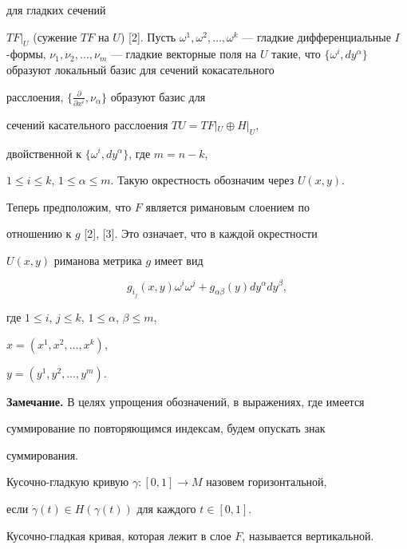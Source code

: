 для гладких сечений 


$TF|_U$ (сужение $TF$ на $U$) [2]. Пусть $\omega^1, \omega^2, \dotsc, 


\omega^k$ --- гладкие дифференциальные $I$-формы, $\nu_1, \nu_2, \dotsc, 


\nu_m$ --- гладкие векторные поля на $U$ такие, что $\{\omega^i, 


dy^\alpha\}$ образуют локальный базис для сечений кокасательного 


расслоения, $\{\frac {\partial}{\partial x^i},\nu_\alpha\}$ образуют базис для 


сечений касательного расслоения $TU=TF|_U\oplus H|_U$, 


двойственной к $\{\omega^i, dy^\alpha\}$, где $m=n-k$,


$1\leq i\leq k$, $1\leq 


\alpha \leq m$. Такую окрестность обозначим через $U(x,y)$.





Теперь предположим, что $F$ является римановым слоением по 


отношению к $g$ [2], [3]. Это означает, что в каждой окрестности 


$U(x,y)$ риманова метрика $g$ имеет вид


$$


g_{i_j}(x, y)\omega^i \omega^j + g_{\alpha \beta}(y)dy^\alpha dy^\beta ,


$$


где $1 \leq i$, $j \leq k$, $1\leq \alpha$, $\beta \leq m$,


$x=(x^1, x^2, \dotsc, x^k)$, 


$y=(y^1, y^2, \dotsc, y^m)$.


\medskip





{\bf Замечание.} В целях упрощения обозначений, в выражениях, где имеется 


суммирование по повторяющимся индексам, будем опускать знак 


суммирования.


\medskip





Кусочно-гладкую кривую $\gamma : [0,1]\to M$ назовем горизонтальной, 


если $\Dot \gamma (t)\in H(\gamma (t))$ для каждого $t\in [0,1]$.


Кусочно-гладкая кривая, которая лежит в слое $F$, называется вертикальной.





